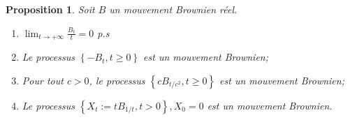\documentclass[A4paper,12pt]{report}
\newtheorem{proposition}{Proposition}[chapter]
\begin{document}
\begin{proposition} 
 Soit $B$ un mouvement Brownien réel.
\begin{enumerate}
\item $\lim_{t \rightarrow +\infty} \frac{B_t}{t} =0$ p.s

\item Le processus $\left\{-B_{t}, t \geq 0\right\}$ est un mouvement Brownien;

\item Pour tout $c>0$, le processus $\left\{c B_{t / c^{2}}, t \geq 0\right\}$ est un mouvement Brownien;

\item Le processus $\left\{X_{t}:=t B_{1 / t}, t>0\right\}, X_{0}=0$ est un mouvement Brownien.
\end{enumerate}

\end{proposition} 
\end{document}
